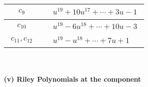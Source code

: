 \documentclass[1p]{elsarticle_modified}
\theoremstyle{definition}
\begin{document}
\begin{tabular}{m{50pt}|m{274pt}}
\hline $$\begin{aligned}c_{9}\end{aligned}$$&$\begin{aligned}
&u^{19}+10 u^{17}+\cdots+3 u-1
\end{aligned}$\\
\hline $$\begin{aligned}c_{10}\end{aligned}$$&$\begin{aligned}
&u^{19}-6 u^{18}+\cdots+10 u-3
\end{aligned}$\\
\hline $$\begin{aligned}c_{11},c_{12}\end{aligned}$$&$\begin{aligned}
&u^{19}- u^{18}+\cdots+7 u+1
\end{aligned}$\\
\hline
\end{tabular}\\~\\
\newpage\renewcommand{\arraystretch}{1}
\flushleft \textbf{(v) Riley Polynomials at the component}\newline \\
\end{document}
